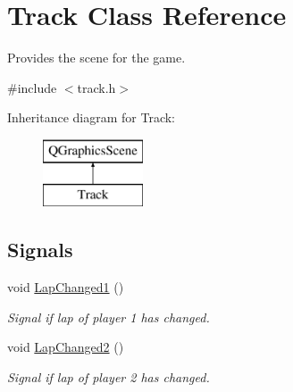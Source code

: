 \hypertarget{class_track}{}\section{Track Class Reference}
\label{class_track}


Provides the scene for the game.  




{\ttfamily \#include $<$track.\+h$>$}

Inheritance diagram for Track\+:\begin{figure}[H]
\begin{center}
\leavevmode
\includegraphics[height=2.000000cm]{class_track}
\end{center}
\end{figure}
\subsection*{Signals}
\begin{DoxyCompactItemize}
\item 
void \mbox{\hyperlink{class_track_a6341de0f1e60210e259507b93bf29872}{Lap\+Changed1}} ()
\begin{DoxyCompactList}\small\item\em Signal if lap of player 1 has changed. \end{DoxyCompactList}\item 
void \mbox{\hyperlink{class_track_ab8fa84676e8143eb45da43d39c0e62b1}{Lap\+Changed2}} ()
\begin{DoxyCompactList}\small\item\em Signal if lap of player 2 has changed. \end{DoxyCompactList}\end{DoxyCompactItemize}
